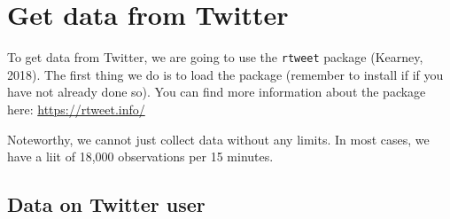 \documentclass[12pt,oneside]{reedthesis}
\theoremstyle{definition}
\theoremstyle{definition}
\theoremstyle{definition}
\theoremstyle{remark}
\begin{document}
  \section{Get data from Twitter}\label{get-data-from-twitter}
  
  To get data from Twitter, we are going to use the \texttt{rtweet}
  package (Kearney, 2018). The first thing we do is to load the package
  (remember to install if if you have not already done so). You can find
  more information about the package here: \url{https://rtweet.info/}
  \begin{Shaded}
  \begin{Highlighting}[]
  \NormalTok{(}\NormalTok{)}
  \end{Highlighting}
  \end{Shaded}
  Noteworthy, we cannot just collect data without any limits. In most
  cases, we have a liit of 18,000 observations per 15 minutes.
  
  \subsection{Data on Twitter user}\label{data-on-twitter-user}
  
\end{document}
